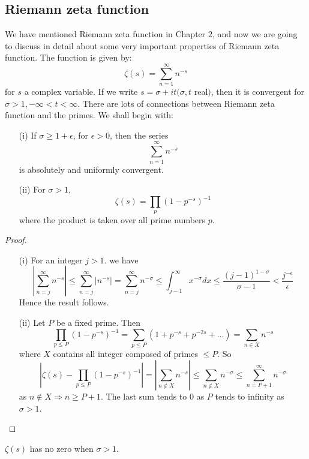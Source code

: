 






\subsection{Riemann zeta function}
We have mentioned Riemann zeta function in Chapter $2$, and now we are going to discuss in detail
about some very important properties of Riemann zeta function. The function is given by:
$$\zeta(s)=\sum_{n=1}^\infty n^{-s}$$
for $s$ a complex variable. If we write $s=\sigma+it (\sigma,t$ real$)$, then it is convergent for
$\sigma >1, -\infty < t <\infty$. There are lots of connections between Riemann zeta function and the primes. We shall begin with:
\begin{theorem}
\begin{enumerate}
\item[(i)] If $\sigma \ge 1+\epsilon$, for $\epsilon > 0$, then the series
$$\sum_{n=1}^{\infty}n^{-s}$$
is absolutely and uniformly convergent.
\item[(ii)] For $\sigma>1$,
$$\zeta(s)=\prod_p \left(1-p^{-s}\right)^{-1}$$
where the product is taken over all prime numbers $p$.
\end{enumerate}
\end{theorem}
\begin{proof}
\begin{enumerate}
\item[(i)] For an integer $j>1$. we have
$$\left|\sum_{n=j}^{\infty} n^{-s}\right| \le \sum_{n=j}^\infty\left|n^{-s}\right|
=\sum_{n=j}^\infty n^{-\sigma} \le \int_{j-1}^\infty x^{-\sigma}dx
\le \frac{(j-1)^{1-\sigma}}{\sigma -1} <\frac{j^{-\epsilon}}{\epsilon}$$
Hence the result follows.
\item[(ii)] Let $P$ be a fixed prime. Then
$$\prod_{p \le P}\left(1-p^{-s}\right)^{-1}=\sum_{p \le P}(1+p^{-s}+p^{-2s}+\ldots)
=\sum_{n \in X}n^{-s}$$
where $X$ contains all integer composed of primes $\le P$. So
$$\left|\zeta(s)-\prod_{p \le P}\left(1-p^{-s}\right)^{-1}\right|
=\left|\sum_{n \not \in X}n^{-s}\right| \le \sum_{n \not \in X} n^{-\sigma}
\le \sum_{n=P+1}^\infty n^{-\sigma}$$
as $n \not \in X \Rightarrow n \ge P+1$. The last sum tends to $0$ as $P$ tends to infinity as
$\sigma >1$.
\end{enumerate}
\end{proof}
\begin{corollary} $\zeta(s)$ has no zero when $\sigma>1$.
\end{corollary}
